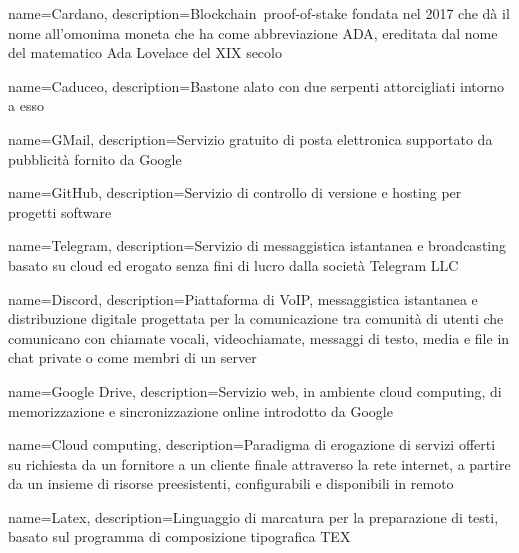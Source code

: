 {
	name={Cardano},
	description={Blockchain\glo\ proof-of-stake fondata nel 2017 che dà il nome all’omonima moneta che ha come abbreviazione ADA, ereditata dal nome del matematico Ada Lovelace del XIX secolo}
}

{
	name={Caduceo},
	description={Bastone alato con due serpenti attorcigliati intorno a esso}
}

{
	name={GMail},
	description={Servizio gratuito di posta elettronica supportato da pubblicità fornito da Google}
}

{
	name={GitHub},
	description={Servizio di controllo di versione e hosting per progetti software}
}

{
	name={Telegram},
	description={Servizio di messaggistica istantanea e broadcasting basato su cloud ed erogato senza fini di lucro dalla società Telegram LLC}
}

{
	name={Discord},
	description={Piattaforma di VoIP, messaggistica istantanea e distribuzione digitale progettata per la comunicazione tra comunità di utenti che comunicano con chiamate vocali, videochiamate, messaggi di testo, media e file in chat private o come membri di un server}
}

{
	name={Google Drive},
	description={Servizio web, in ambiente cloud computing\glo, di memorizzazione e sincronizzazione online introdotto da Google}
}

{
	name={Cloud computing},
	description={Paradigma di erogazione di servizi offerti su richiesta da un fornitore a un cliente finale attraverso la rete internet, a partire da un insieme di risorse preesistenti, configurabili e disponibili in remoto}
}

{
	name={Latex},
	description={Linguaggio di marcatura per la preparazione di testi, basato sul programma di composizione tipografica TEX}
}

